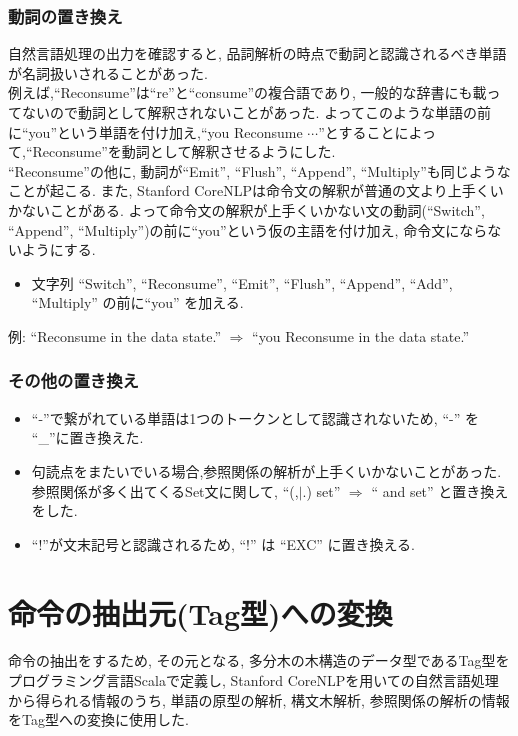 \documentclass[uplatex,a4j]{jsreport}
\begin{document}
\subsubsection*{動詞の置き換え}
自然言語処理の出力を確認すると, 品詞解析の時点で動詞と認識されるべき単語が名詞扱いされることがあった.\\
例えば,``Reconsume''は``re''と``consume''の複合語であり, 一般的な辞書にも載ってないので動詞として解釈されないことがあった.
よってこのような単語の前に``you''という単語を付け加え,``you Reconsume $\cdots$''とすることによって,``Reconsume''を動詞として解釈させるようにした.\\
``Reconsume''の他に, 動詞が``Emit'', ``Flush'', ``Append'', ``Multiply''も同じようなことが起こる.
また, Stanford CoreNLPは命令文の解釈が普通の文より上手くいかないことがある.
よって命令文の解釈が上手くいかない文の動詞(``Switch'', ``Append'', ``Multiply'')の前に``you''という仮の主語を付け加え, 命令文にならないようにする.\\
\begin{itemize}
   \item 文字列 ``Switch'', ``Reconsume'', ``Emit'', ``Flush'', ``Append'', ``Add'', ``Multiply'' の前に``you'' を加える.
\end{itemize}
例: 
``Reconsume in the data state.'' $\Rightarrow$ ``you Reconsume in the data state.''
\subsubsection*{その他の置き換え}
\begin{itemize}
   \item ``-''で繋がれている単語は1つのトークンとして認識されないため, ``-'' を ``_''に置き換えた.
   \item 句読点をまたいでいる場合,参照関係の解析が上手くいかないことがあった. 参照関係が多く出てくるSet文に関して, 
   ``(,$|$.) set'' $\Rightarrow$ `` and set'' と置き換えをした.
   \item ``!''が文末記号と認識されるため, ``!'' は ``EXC'' に置き換える.
\end{itemize}

\section{命令の抽出元(Tag型)への変換}
命令の抽出をするため, その元となる, 多分木の木構造のデータ型であるTag型をプログラミング言語Scalaで定義し, 
Stanford CoreNLPを用いての自然言語処理から得られる情報のうち,
単語の原型の解析, 構文木解析, 参照関係の解析の情報をTag型への変換に使用した.
\end{document}
